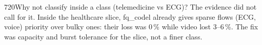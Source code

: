 \begin{qa}{720}{Why not classify inside a class (telemedicine vs ECG)?}
The evidence did not call for it. Inside the healthcare slice, fq\_codel already gives sparse flows (ECG, voice)
priority over bulky ones: their loss was 0\,\% while video lost 3--6\,\%. The fix was capacity and burst tolerance
for the slice, not a finer class.
\end{qa}


